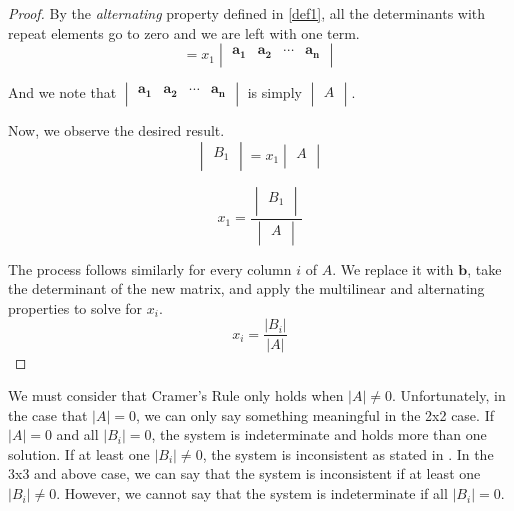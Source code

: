 \documentclass[11pt,reqno]{amsart}
\theoremstyle{definition}
\begin{document}
\begin{proof}
By the \textit{alternating} property defined in \ref{def1}, all the determinants with repeat elements go to zero and we are left with one term. 
\[
= x_1\!
\begin{vmatrix}
     \mathbf{a_1} & \mathbf{a_{2}} & \cdots & \mathbf{a_{n}}\\
\end{vmatrix}
\]

And we note that 
$\begin{vmatrix}
     \mathbf{a_1} & \mathbf{a_{2}} & \cdots & \mathbf{a_{n}}\\
\end{vmatrix}$ is simply  
$\begin{vmatrix}
    A\\
\end{vmatrix}$.


Now, we observe the desired result.
\[
\begin{vmatrix}
    B_1\\
\end{vmatrix} 
= x_1\!
\begin{vmatrix}
    A\\
\end{vmatrix} 
\]

\[
x_1 = \frac{
\begin{vmatrix}
    B_1\\
\end{vmatrix}
}{
\begin{vmatrix}
    A\\
\end{vmatrix}
}
\]

The process follows similarly for every column $i$ of $A$. We replace it with $\mathbf{b}$, take the determinant of the new matrix, and apply the multilinear and alternating properties to solve for $x_i$.
\[ x_i = \frac{|B_i|}{|A|}
\]

\end{proof}

We must consider that Cramer's Rule only holds when $|A| \neq 0$. Unfortunately, in the case that $|A| = 0$, we can only say something meaningful in the 2x2 case. If $|A| = 0$ and all $|B_i| = 0$, the system is indeterminate and holds more than one solution. If at least one $|B_i| \neq 0$, the system is inconsistent as stated in \cite{det}.
In the 3x3 and above case, we can say that the system is inconsistent if at least one $|B_i| \neq 0$. However, we cannot say that the system is indeterminate if all $|B_i| = 0$.\\ 
\end{document}
